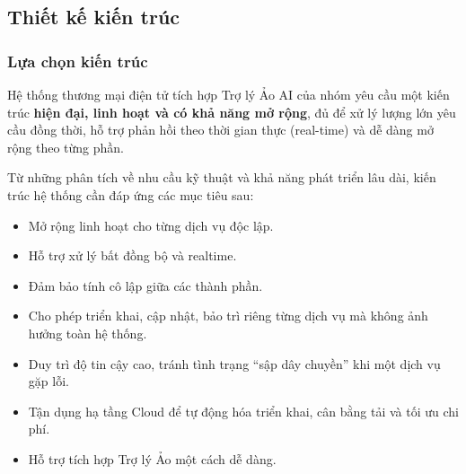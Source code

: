 \subsection{Thiết kế kiến trúc}
\subsubsection{Lựa chọn kiến trúc}
Hệ thống thương mại điện tử tích hợp Trợ lý Ảo AI của nhóm yêu cầu một kiến trúc \textbf{hiện đại, linh hoạt và có khả năng mở rộng}, đủ để xử lý lượng lớn yêu cầu đồng thời, hỗ trợ phản hồi theo thời gian thực (real-time) và dễ dàng mở rộng theo từng phần.

Từ những phân tích về nhu cầu kỹ thuật và khả năng phát triển lâu dài, kiến trúc hệ thống cần đáp ứng các mục tiêu sau:
\begin{itemize}
    \item Mở rộng linh hoạt cho từng dịch vụ độc lập.
    \item Hỗ trợ xử lý bất đồng bộ và realtime.
    \item Đảm bảo tính cô lập giữa các thành phần.
    \item Cho phép triển khai, cập nhật, bảo trì riêng từng dịch vụ mà không ảnh hưởng toàn hệ thống.
    \item Duy trì độ tin cậy cao, tránh tình trạng “sập dây chuyền” khi một dịch vụ gặp lỗi.
    \item Tận dụng hạ tầng Cloud để tự động hóa triển khai, cân bằng tải và tối ưu chi phí.
    \item Hỗ trợ tích hợp Trợ lý Ảo một cách dễ dàng.
\end{itemize}

